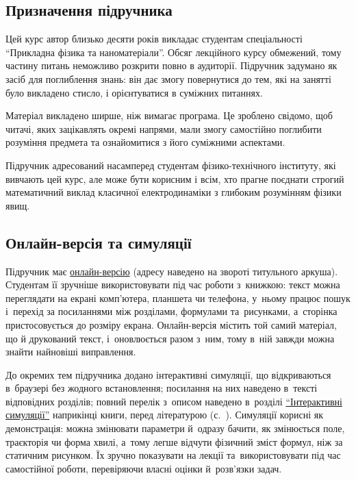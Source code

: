 \subsection*{Призначення підручника}

Цей курс автор близько десяти років викладає студентам спеціальності
\enquote{Прикладна фізика та наноматеріали}. Обсяг лекційного курсу обмежений, тому
частину питань неможливо розкрити повно в аудиторії. Підручник задумано як засіб для
поглиблення знань: він дає змогу повернутися до тем, які на занятті було викладено
стисло, і орієнтуватися в суміжних питаннях.

Матеріал викладено ширше, ніж вимагає програма. Це зроблено свідомо, щоб читачі, яких
зацікавлять окремі напрями, мали змогу самостійно поглибити розуміння предмета та
ознайомитися з його суміжними аспектами.

Підручник адресований насамперед студентам фізико-технічного інституту, які вивчають цей
курс, але може бути корисним і всім, хто прагне поєднати строгий математичний виклад
класичної електродинаміки з глибоким розумінням фізики явищ.

\subsection*{Онлайн-версія та симуляції}

Підручник має \href{https://sergiokapone.github.io/ElMagConspect/}{онлайн-версію}
(адресу наведено на звороті титульного аркуша).
Студентам її зручніше використовувати під час роботи з~книжкою: текст
можна переглядати на екрані комп'ютера, планшета чи телефона, у~ньому працює
пошук і~перехід за посиланнями між розділами, формулами та~рисунками, а~сторінка
пристосовується до розміру екрана. Онлайн-версія містить той самий матеріал, що й
друкований текст, і~оновлюється разом з~ним, тому в~ній завжди можна знайти
найновіші виправлення.

До окремих тем підручника додано інтерактивні симуляції, що відкриваються в~браузері
без жодного встановлення; посилання на них наведено в~тексті відповідних розділів;
повний перелік з~описом наведено в~розділі \hyperlink{Simulations}{\enquote{Інтерактивні симуляції}} наприкінці книги, перед літературою (с.~\pageref{sec:Simulations}).
Симуляції корисні як демонстрація: можна змінювати параметри й~одразу бачити, як
змінюється поле, траєкторія чи форма хвилі, а~тому легше відчути фізичний зміст формул,
ніж за статичним рисунком. Їх зручно показувати на лекції та~використовувати під час
самостійної роботи, перевіряючи власні оцінки й~розв'язки задач.

